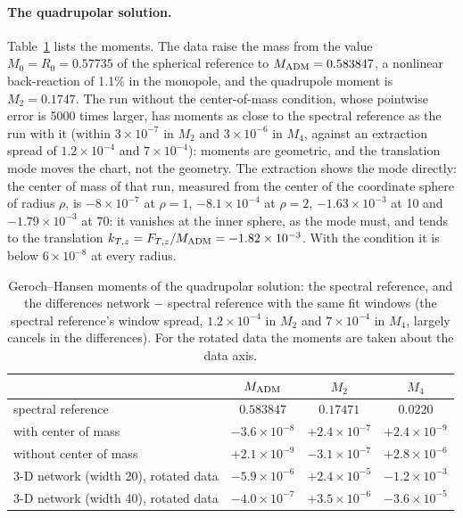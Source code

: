\documentclass[aps,prd,twocolumn,superscriptaddress, nofootinbib,floatfix]{revtex4-2}
\begin{document}
\paragraph{The quadrupolar solution.} Table~\ref{tab:moments} lists the moments.
The data raise the mass from the value $M_0=R_0 = 0.57735$ of the spherical reference to $M_{\rm ADM} = 0.583847$, a nonlinear back-reaction of 1.1\% in the monopole, and the quadrupole moment is $M_2 = 0.1747$.
The run without the center-of-mass condition, whose pointwise error is 5000 times larger, has moments as close to the spectral reference as the run with it (within $3\times10^{-7}$ in $M_2$ and $3\times10^{-6}$ in $M_4$, against an extraction spread of $1.2\times10^{-4}$ and $7\times10^{-4}$): moments are geometric, and the translation mode moves the chart, not the geometry.
The extraction shows the mode directly: the center of mass of that run, measured from the center of the coordinate sphere of radius $\rho$, is $-8\times10^{-7}$ at $\rho=1$, $-8.1\times10^{-4}$ at $\rho=2$, $-1.63\times10^{-3}$ at 10 and $-1.79\times10^{-3}$ at 70: it vanishes at the inner sphere, as the mode must, and tends to the translation $k_{T,z} = F_{T,z}/M_{\rm ADM} = -1.82\times10^{-3}$.
With the condition it is below $6\times10^{-8}$ at every radius.

\begin{table}
\caption{Geroch--Hansen moments of the quadrupolar solution: the spectral reference, and the
differences network $-$ spectral reference with the same fit windows (the spectral reference's window spread,
$1.2\times10^{-4}$ in $M_2$ and $7\times10^{-4}$ in $M_4$, largely cancels in the differences).
For the rotated data the moments are taken about the data axis.}
\label{tab:moments}
\begin{ruledtabular}
\begin{tabular}{lccc}
 & $M_{\rm ADM}$ & $M_2$ & $M_4$ \\
\hline
spectral reference & $0.583847$ & $0.17471$ & $0.0220$ \\
with center of mass & $-3.6\times10^{-8}$ & $+2.4\times10^{-7}$ & $+2.4\times10^{-9}$ \\
without center of mass & $+2.1\times10^{-9}$ & $-3.1\times10^{-7}$ & $+2.8\times10^{-6}$ \\
3-D network (width 20), rotated data & $-5.9\times10^{-6}$ & $+2.4\times10^{-5}$ & $-1.2\times10^{-3}$ \\
3-D network (width 40), rotated data & $-4.0\times10^{-7}$ & $+3.5\times10^{-6}$ & $-3.6\times10^{-5}$ \\
\end{tabular}
\end{ruledtabular}
\end{table}
\end{document}
